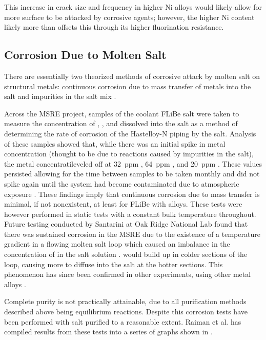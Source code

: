 This increase in crack size and frequency in higher Ni alloys would
likely allow for more surface to be
attacked by corrosive agents; however, the higher Ni content likely
more than offsets this through its
higher fluorination resistance. \par

\subsection{Corrosion Due to Molten Salt}
\label{sec: corrosion due to salt}

There are essentially two theorized methods of corrosive attack by molten salt
on structural metals: continuous corrosion due to mass transfer of metals
into the salt and impurities in the salt mix \cite{rev54}. \par

Across the MSRE project, samples of the coolant FLiBe salt were taken to
measure the concentration of , , and  dissolved into
the salt as a method of determining the rate of corrosion of the Hastelloy-N
piping by the salt. Analysis of these samples showed that, while there was
an initial spike in metal concentration (thought to be due to reactions
caused by impurities in the salt), the metal concentratileveled off at
\SI{32}{ppm} , \SI{64}{ppm} , and \SI{20}{ppm} . These
values persisted allowing for the time between samples to be taken monthly
and did not spike again until the system had become
contaminated due to atmospheric exposure \cite{rev54}. These findings imply
that continuous corrosion due to mass transfer is minimal, if not
nonexistent, at least for FLiBe with  alloys. These tests were however
performed in static tests with a constant bulk temperature
throughout. Future testing conducted by Santarini at Oak Ridge National
Lab found that there was sustained corrosion in the MSRE due to the
existence of a temperature gradient in a flowing molten salt loop which
caused an imbalance in the concentration of  in the salt
solution \cite{rev55}.  would build up in colder sections
of the loop, causing more  to diffuse into the salt at the hotter
sections\cite{rev55}. This phenomenon has since been confirmed
in other experiments, using other metal alloys \cite{rev23,rev35,rev36}. \par

Complete purity is not practically attainable, due to all purification
methods described above being equilibrium reactions. Despite this
corrosion tests have been performed with salt purified to a
reasonable extent. Raiman et al. has compiled results from these tests
into a series of graphs shown in
 \cite{rev34}. \par

